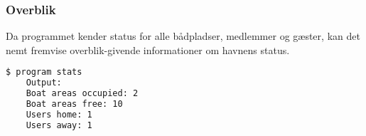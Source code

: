 \subsubsection{Overblik}
\label{ssub:overblik}

Da programmet kender status for alle bådpladser, medlemmer og gæster, kan det nemt fremvise overblik-givende informationer om havnens status.

\begin{lstlisting}[language=bash, label={lst:overview}] 
  $ program stats 
    Output:
    Boat areas occupied: 2
    Boat areas free: 10
    Users home: 1
    Users away: 1
\end{lstlisting}
